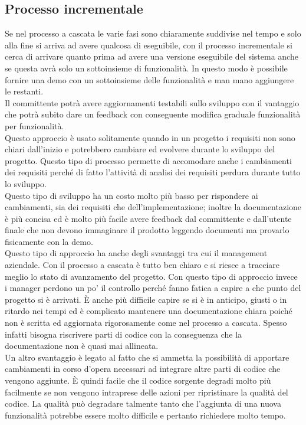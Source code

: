 \subsection{Processo incrementale}
Se nel processo a cascata le varie fasi sono chiaramente suddivise nel tempo e solo alla fine si arriva ad avere qualcosa di eseguibile, con il processo incrementale si cerca di arrivare quanto prima ad avere una versione eseguibile del sistema anche se questa avrà solo un sottoinsieme di funzionalità.
In questo modo è possibile fornire una demo con un sottoinsieme delle funzionalità e man mano aggiungere le restanti.\\
Il committente potrà avere aggiornamenti testabili sullo sviluppo con il vantaggio che potrà subito dare un feedback con conseguente modifica graduale funzionalità per funzionalità.\\
Questo approccio è usato solitamente quando in un progetto i requisiti non sono chiari dall'inizio e potrebbero cambiare ed evolvere durante lo sviluppo del progetto.
Questo tipo di processo permette di accomodare anche i cambiamenti dei requisiti perché di fatto l'attività di analisi dei requisiti perdura durante tutto lo sviluppo.\\
Questo tipo di sviluppo ha un costo molto più basso per rispondere ai cambiamenti, sia dei requisiti che dell'implementazione; inoltre la documentazione è più concisa ed è molto più facile avere feedback dal committente e dall'utente finale che non devono immaginare il prodotto leggendo documenti ma provarlo fisicamente con la demo.\\
Questo tipo di approccio ha anche degli svantaggi tra cui il management aziendale.
Con il processo a cascata è tutto ben chiaro e si riesce a tracciare meglio lo stato di avanzamento del progetto.
Con questo tipo di approccio invece i manager perdono un po' il controllo perché fanno fatica a capire a che punto del progetto si è arrivati.
È anche più difficile capire se si è in anticipo, giusti o in ritardo nei tempi ed è complicato mantenere una documentazione chiara poiché non è scritta ed aggiornata rigorosamente come nel processo a cascata.
Spesso infatti bisogna riscrivere parti di codice con la conseguenza che la documentazione non è quasi mai allineata.\\
Un altro svantaggio è legato al fatto che si ammetta la possibilità di apportare cambiamenti in corso d'opera necessari ad integrare altre parti di codice che vengono aggiunte.
È quindi facile che il codice sorgente degradi molto più facilmente se non vengono intraprese delle azioni per ripristinare la qualità del codice.
La qualità può degradare talmente tanto che l'aggiunta di una nuova funzionalità potrebbe essere molto difficile e pertanto richiedere molto tempo.

